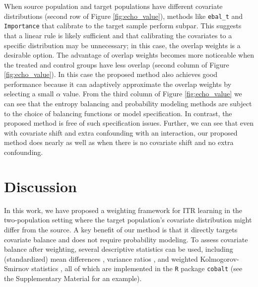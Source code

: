 \documentclass[12pt]{article}
\begin{document}
When source population and target populations have different covariate distributions (second row of Figure \ref{fig:echo_value}), methods like \texttt{ebal\_t} and \texttt{Importance} that calibrate to the target sample perform subpar. This suggests that a linear rule is likely sufficient and that calibrating the covariates to a specific distribution may be unnecessary; in this case, the overlap weights is a desirable option. The advantage of overlap weights becomes more noticeable when the treated and control groups have less overlap (second column of Figure \ref{fig:echo_value}). In this case the proposed method also achieves good performance because it can adaptively approximate the overlap weights by selecting a small $\alpha$ value. From the third column of Figure \ref{fig:echo_value} we can see that the entropy balancing  and probability modeling methods are subject to the choice of balancing functions or model specification. In contrast, the proposed method is free of such specification issues. Further, we can see that even with covariate shift and extra confounding with an interaction, our proposed method does nearly as well as when there is no covariate shift and no extra confounding.


\section{Discussion}
\label{sec:discussion}

In this work, we have proposed a weighting framework for ITR learning in the two-population setting where the target population's covariate distribution might differ from the source. A key benefit of our method is that it directly targets covariate balance and does not require probability modeling. To assess covariate balance after weighting, several descriptive statistics can be used, including (standardized) mean differences \citep{rosenbaum1985constructing}, variance ratios \citep{austin2009balance}, and weighted Kolmogorov-Smirnov statistics \citep{austin2015moving}, all of which are implemented in the \texttt{R} package \texttt{cobalt} (see the Supplementary Material for an example). 
\end{document}
